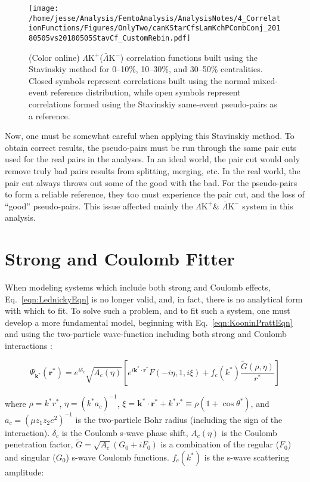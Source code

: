 \documentclass[ALICE,manyauthors]{cernphprep}
\newcommand{\LamKchP}{$\Lambda\mathrm{K^{+}}$\xspace}
\newcommand{\ALamKchM}{$\bar{\Lambda}\mathrm{K^{-}}$\xspace}
\newcommand{\LamKchPALamKchM}{$\Lambda\mathrm{K^{+}}$($\bar{\Lambda}\mathrm{K^{-}}$)\xspace}
\begin{document}
\begin{figure}[h!]
  \centering
  \texttt{[image: /home/jesse/Analysis/FemtoAnalysis/AnalysisNotes/4\_CorrelationFunctions/Figures/OnlyTwo/canKStarCfsLamKchPCombConj\_20180505vs20180505StavCf\_CustomRebin.pdf]}
  \caption[\LamKchP Stavinskiy Correlation Functions]
  {
  (Color online) \LamKchPALamKchM correlation functions built using the Stavinskiy method for 0--10\%, 10--30\%, and 30--50\% centralities.  Closed symbols represent correlations built using the normal mixed-event reference distribution, while open symbols represent correlations formed using the Stavinskiy same-event pseudo-pairs as a reference.
  }
  \label{fig:StavCfs_Correct_LamKchP}
\end{figure} 

Now, one must be somewhat careful when applying this Stavinskiy method.  
To obtain correct results, the pseudo-pairs must be run through the same pair cuts used for the real pairs in the analyses.  
In an ideal world, the pair cut would only remove truly bad pairs results from splitting, merging, etc.  
In the real world, the pair cut always throws out some of the good with the bad.  
For the pseudo-pairs to form a reliable reference, they too must experience the pair cut, and the loss of ``good'' pseudo-pairs.  
This issue affected mainly the \LamKchP \& \ALamKchM system in this analysis.



\section{Strong and Coulomb Fitter}
\label{App:CoulombFitter}

When modeling systems which include both strong and Coulomb effects, Eq.\ \ref{eqn:LednickyEqn} is no longer valid, and, in fact, there is no analytical form with which to fit.
To solve such a problem, and to fit such a system, one must develop a more fundamental model, beginning with Eq.\ \ref{eqn:KooninPrattEqn} and using the two-particle wave-function including both strong and Coulomb interactions \cite{Lednicky:2005tb}:

\begin{equation}
 \Psi_{\mathbf{k^{*}}}(\mathbf{r^{*}}) = e^{i\delta_{c}}\sqrt{A_{c}(\eta)}[e^{i\mathbf{k^{*}} \cdot \mathbf{r^{*}}}F(-i\eta,1,i\xi) + f_{c}(k^{*})\frac{\tilde{G}(\rho,\eta)}{r^{*}}]
\label{eqn:CoulombWaveFcn}
\end{equation}

where $\rho = k^{*}r^{*}$, $\eta = (k^{*}a_{c})^{-1}$, $\xi = \mathbf{k^{*}} \cdot \mathbf{r^{*}} + k^{*}r^{*} \equiv \rho(1+\cos\theta^{*})$, and $a_{c} = (\mu z_{1}z_{2}e^{2})^{-1}$ is the two-particle Bohr radius (including the sign of the interaction).  
$\delta_{c}$ is the Coulomb s-wave phase shift, $A_{c}(\eta)$ is the Coulomb penetration factor, $\tilde{G} = \sqrt{A_{c}}(G_{0} + iF_{0})$ is a combination of the regular ($F_{0}$) and singular ($G_{0}$) s-wave Coulomb functions.  
$f_{c}(k^{*})$ is the s-wave scattering amplitude:
\end{document}
